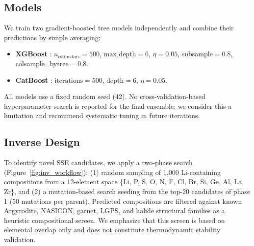 \documentclass[12pt]{article}
\begin{document}
\subsection{Models}

We train two gradient-boosted tree models independently and combine their predictions
by simple averaging:
\begin{itemize}
    \item \textbf{XGBoost} \cite{chen2016xgboost}: $n_{\text{estimators}}=500$,
          $\text{max\_depth}=6$, $\eta=0.05$, subsample$=0.8$,
          colsample\_bytree$=0.8$.
    \item \textbf{CatBoost} \cite{prokhorenkova2018catboost}: $\text{iterations}=500$,
          $\text{depth}=6$, $\eta=0.05$.
\end{itemize}
All models use a fixed random seed (42). No cross-validation-based hyperparameter
search is reported for the final ensemble; we consider this a limitation and recommend
systematic tuning in future iterations.

\subsection{Inverse Design}

To identify novel SSE candidates, we apply a two-phase search
(Figure~\ref{fig:inv_workflow}): (1) random sampling of 1,000 Li-containing
compositions from a 12-element space \{Li, P, S, O, N, F, Cl, Br, Si, Ge, Al, La,
Zr\}, and (2) a mutation-based search seeding from the top-20 candidates of phase 1
(50 mutations per parent). Predicted compositions are filtered against known
Argyrodite, NASICON, garnet, LGPS, and halide structural families as a heuristic
compositional screen. We emphasize that this screen is based on elemental overlap
only and does not constitute thermodynamic stability validation.
\end{document}
